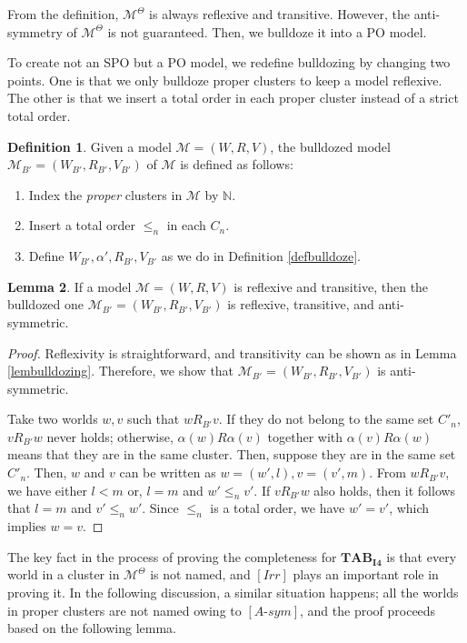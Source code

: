\documentclass{article}
\theoremstyle{definition}
\newtheorem{definition}{Definition}[section]
\newtheorem{lemma}[definition]{Lemma}
\newcommand{\Kmodel}{\mathcal{M}}
\newcommand{\irr}{\mathit{Irr}}
\newcommand{\antisym}{\mathit{A\text{-}sym}}
\newcommand{\tableauIF}{\mathbf{TAB}_{\mathbf{I4}}}
\begin{document}
From the definition, $\Kmodel^\Theta$ is always reflexive and transitive. However, the anti-symmetry of $\Kmodel^\Theta$ is not guaranteed. Then, we bulldoze it into a PO model. 

To create not an SPO but a PO model, we redefine bulldozing by changing two points. One is that we only bulldoze proper clusters to keep a model reflexive. The other is that we insert a total order in each proper cluster instead of a strict total order.

\begin{definition}
    Given a model $\Kmodel = (W, R, V)$, the bulldozed model $\Kmodel_{B'} = (W_{B'}, R_{B'}, V_{B'})$ of $\Kmodel$ is defined as follows:
    \begin{enumerate}[1.]
        \item Index the \emph{proper} clusters in $\Kmodel$ by $\mathbb{N}$.
        \item Insert a total order $\leq_n$ in each $C_n$.
        \item Define $W_{B'}, \alpha', R_{B'}, V_{B'}$ as we do in Definition \ref{defbulldoze}.
    \end{enumerate}
    \label{defbulldozePO}
\end{definition}

\begin{lemma}
    If a model $\Kmodel = (W, R, V)$ is reflexive and transitive, then the bulldozed one $\Kmodel_{B'} = (W_{B'}, R_{B'}, V_{B'})$ is reflexive, transitive, and anti-symmetric.
    \label{lembulldozingPO}
\end{lemma}
\begin{proof}
    Reflexivity is straightforward, and transitivity can be shown as in Lemma \ref{lembulldozing}. Therefore, we show that $\Kmodel_{B'} = (W_{B'}, R_{B'}, V_{B'})$ is anti-symmetric.

    Take two worlds $w, v$ such that $w R_{B'} v$. If they do not belong to the same set $C'_n$, $v R_{B'} w$ never holds; otherwise, $\alpha(w) R \alpha(v)$ together with $\alpha(v) R \alpha(w)$ means that they are in the same cluster. Then, suppose they are in the same set $C'_n$. Then, $w$ and $v$ can be written as $w = (w', l), v = (v', m)$. From $w R_{B'} v$, we have either $l < m$ or, $l = m$ and $w' \leq_n v'$. If $v R_{B'} w$ also holds, then it follows that $l = m$ and $v' \leq_n w'$. Since $\leq_n$ is a total order, we have $w' = v'$, which implies $w = v$.
\end{proof}

The key fact in the process of proving the completeness for $\tableauIF$ is that every world in a cluster in $\Kmodel^\Theta$ is not named, and $[\irr]$ plays an important role in proving it. In the following discussion, a similar situation happens; all the worlds in proper clusters are not named owing to $[\antisym]$, and the proof proceeds based on the following lemma.
\end{document}
